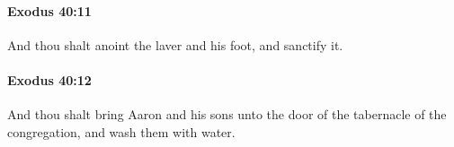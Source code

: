 		\paragraph{Exodus 40:11} %
			\label{EXODUS-40-11}

			And thou shalt anoint the laver and his foot, and sanctify it.


		\paragraph{Exodus 40:12} %
			\label{EXODUS-40-12}

			And thou shalt bring Aaron and his sons unto the door of the tabernacle of the congregation, and wash them with water.


